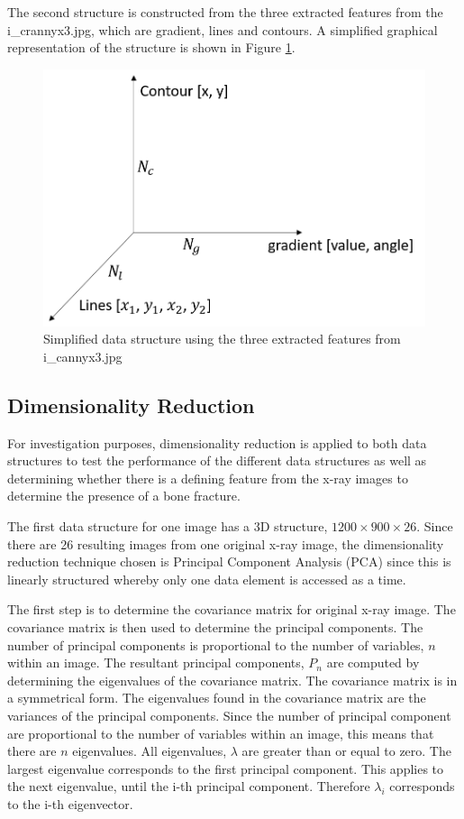 \documentclass[11pt,twocolumn]{witseiepaper}
\begin{document}
	The second structure is constructed from the three extracted features from the i\_crannyx3.jpg, which are gradient, lines and contours. A simplified graphical representation of the structure is shown in Figure \ref{fig: second_structure}. 
	\begin{figure}[!h]
		\centering
		\includegraphics[scale=0.23]{second_structure.png}
		\caption{Simplified data structure using the three extracted features from i\_cannyx3.jpg}
		\label{fig: second_structure}
	\end{figure}
	
	\subsection{Dimensionality Reduction}
	For investigation purposes, dimensionality reduction is applied to both data structures to test the performance of the different data structures as well as determining whether there is a defining feature from the x-ray images to determine the presence of a bone fracture.
	
	The first data structure for one image has a 3D structure, $1200 \times 900 \times 26$. Since there are 26 resulting images from one original x-ray image, the dimensionality reduction technique chosen is Principal Component Analysis (PCA) since this is linearly structured whereby only one data element is accessed as a time. 
	
	The first step is to determine the covariance matrix for original x-ray image. The covariance matrix is then used to determine the principal components. The number of principal components is proportional to the number of variables, $n$ within an image. The resultant principal components, $P_n$ are computed by determining the eigenvalues of the covariance matrix. The covariance matrix is in a symmetrical form. The eigenvalues found in the covariance matrix are the variances of the principal components. Since the number of principal component are proportional to the number of variables within an image, this means that there are $n$ eigenvalues. All eigenvalues, $\lambda$ are greater than or equal to zero. The largest eigenvalue corresponds to the first principal component. This applies to the next eigenvalue, until the i-th principal component. Therefore $\lambda_i$ corresponds to the i-th eigenvector.
	
\end{document}
